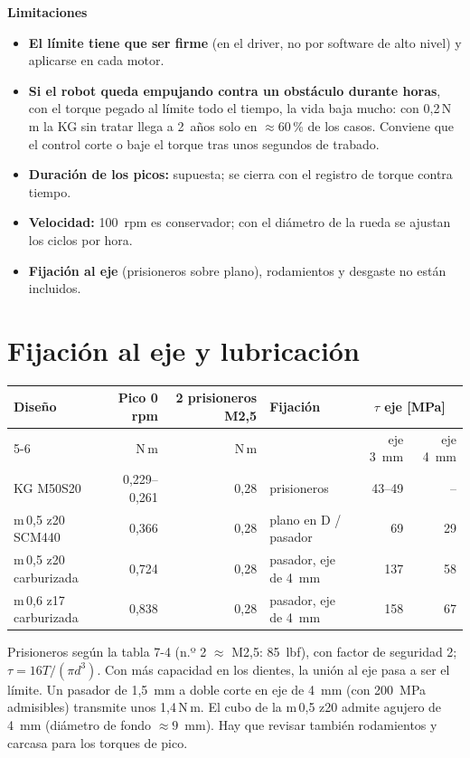 \documentclass[11pt,a4paper]{article}
\newcommand{\Nm}{\,N\,m\xspace}
\begin{document}
\textbf{Limitaciones}
\begin{itemize}
  \item \textbf{El límite tiene que ser firme} (en el driver, no por software de alto nivel) y aplicarse en cada motor.
  \item \textbf{Si el robot queda empujando contra un obstáculo durante horas}, con el torque pegado al límite todo el
        tiempo, la vida baja mucho: con 0,2\Nm la KG sin tratar llega a 2~años solo en $\approx$60\,\% de los casos.
        Conviene que el control corte o baje el torque tras unos segundos de trabado.
  \item \textbf{Duración de los picos:} supuesta; se cierra con el registro de torque contra tiempo.
  \item \textbf{Velocidad:} 100~rpm es conservador; con el diámetro de la rueda se ajustan los ciclos por hora.
  \item \textbf{Fijación al eje} (prisioneros sobre plano), rodamientos y desgaste no están incluidos.
\end{itemize}

\section{Fijación al eje y lubricación}
\begin{table}[H]\centering\small\setlength{\tabcolsep}{4pt}
\begin{tabular}{l r r l r r}
\toprule
Diseño & Pico 0 rpm & 2 prisioneros M2,5 & Fijación & \multicolumn{2}{c}{$\tau$ eje [MPa]}\\
\cmidrule(lr){5-6}
 & N\,m & N\,m & & eje 3~mm & eje 4~mm\\
\midrule
KG M50S20 & 0,229--0,261 & 0,28 & prisioneros & 43--49 & --\\
m\,0,5 z20 SCM440 & 0,366 & 0,28 & plano en D / pasador & 69 & 29\\
m\,0,5 z20 carburizada & 0,724 & 0,28 & pasador, eje de 4~mm & 137 & 58\\
m\,0,6 z17 carburizada & 0,838 & 0,28 & pasador, eje de 4~mm & 158 & 67\\
\bottomrule
\end{tabular}
\end{table}
Prisioneros según la tabla 7-4 (n.º 2 $\approx$ M2,5: 85~lbf), con factor de seguridad 2; $\tau=16T/(\pi d^3)$.
Con más capacidad en los dientes, la unión al eje pasa a ser el límite. Un pasador de 1,5~mm a doble corte en eje de 4~mm
(con 200~MPa admisibles) transmite unos 1,4\Nm. El cubo de la m\,0,5 z20 admite agujero de 4~mm (diámetro de fondo $\approx9$~mm).
Hay que revisar también rodamientos y carcasa para los torques de pico.
\end{document}

